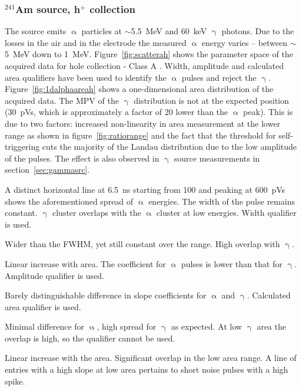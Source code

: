 \clearpage
\subsubsection{$^{241}$Am source, h$^+$ collection}
\label{sec:amsrch}
The source emits $\upalpha$ particles at $\sim$5.5~MeV and 60~keV $\upgamma$ photons. Due to the losses in the air and in the electrode the measured $\upalpha$ energy varies -- between $\sim$5~MeV down to 1~MeV.  Figure~\ref{fig:scatterah} shows the parameter space of the acquired data for hole collection - Class A . Width, amplitude and calculated area qualifiers have been used to identify the $\upalpha$ pulses and reject the $\upgamma$. Figure~\ref{fig:1dalphaareah} shows a one-dimensional area distribution of the acquired data. The MPV of the $\upgamma$ distribution is not at the expected position (30~pVs, which is approximately a factor of 20 lower than the $\upalpha$ peak). 
This is due to two factors: increased non-linearity in area measurement at the lower range as shown in figure~\ref{fig:ratiorange} and the fact that the threshold for self-triggering cuts the majority of the Landau distribution due to the low amplitude of the pulses. 
The effect is also observed in $\upgamma$ source measurements in section~\ref{sec:gammasrc}.
\begin{description}
\setlength\itemsep{-0.3em}
\item[Width: ] A distinct horizontal line at 6.5~ns starting from 100 and peaking at 600~pVs shows the aforementioned spread of $\upalpha$ energies. The width of the pulse remains constant. $\upgamma$ cluster overlaps with the $\upalpha$ cluster at low energies. Width qualifier is used.
\item[Base width: ] Wider than the FWHM, yet still constant over the range. High overlap with $\upgamma$.
\item[Amplitude: ] Linear increase with area. The coefficient for $\upalpha$ pulses is lower than that for $\upgamma$. Amplitude qualifier is used.
\item[Calculated area: ] Barely distinguishable difference in slope coefficients for $\upalpha$ and $\upgamma$. Calculated area qualifier is used.
\item[Base width -- width: ] Minimal difference for $\upalpha$, high spread for $\upgamma$ as expected. At low $\upgamma$ area the overlap is high, so the qualifier cannot be used.
\item[Slope: ] Linear increase with the area. Significant overlap in the low area range. A line of entries with a high slope at low area pertains to short noise pulses with a high spike.
\end{description}

